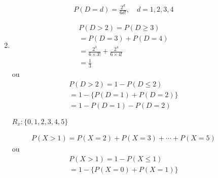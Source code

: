 \begin{description}
\begin{example}
\begin{enumerate}[label=(\alph*)]
\begin{align*}
               P(D=d)=\frac{2^d}{6d!},\quad d=1,2,3,4
             \end{align*}
           \item 
             \begin{align*}
               P(D>2)=P(D \geq 3) \\
               =P(D=3)+P(D=4)\\
               =\frac{2^3}{6\times 3!}+ \frac{2^4}{6\times 4!}\\
               =\frac{1}{3}
             \end{align*}
             ou 
             \begin{align*}
               P(D>2)=1-P(D\le 2)\\
               = 1- \{ P(D=1)+ P(D=2) \}\\
               = 1- P(D=1)- P(D=2)
             \end{align*}
             \begin{obs}$R_{x}: \{0,1,2,3,4,5 \}$\end{obs}
             \begin{align*}
               P(X>1)=P(X=2)+ P(X=3)+\cdots+P(X=5)
             \end{align*}
             ou
             \begin{align*}
               P(X>1)= 1-P(X\le 1)\\
               = 1- \{ P(X=0)+ P(X=1) \}
             \end{align*}
         \end{enumerate}
     \end{example}
 \end{description}
